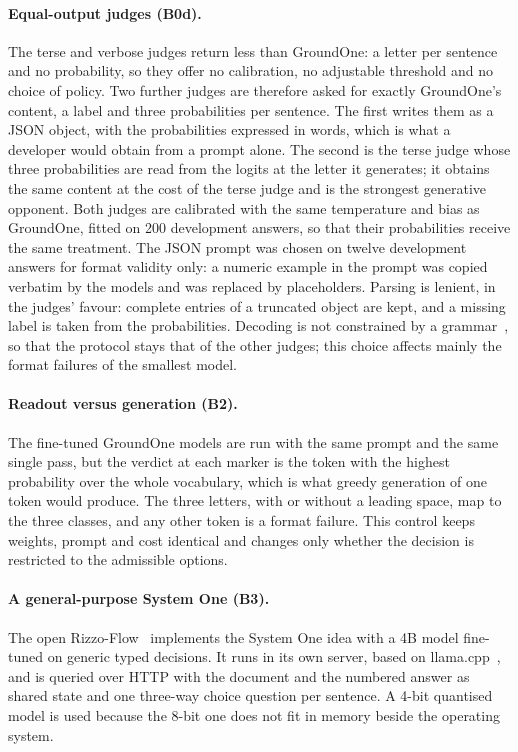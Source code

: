 \paragraph{Equal-output judges (B0d).} The terse and verbose judges return less than GroundOne: a letter per sentence
and no probability, so they offer no calibration, no adjustable threshold and no choice of policy. Two further judges
are therefore asked for exactly GroundOne's content, a label and three probabilities per sentence. The first writes them
as a JSON object, with the probabilities expressed in words, which is what a developer would obtain from a prompt alone.
The second is the terse judge whose three probabilities are read from the logits at the letter it generates; it obtains
the same content at the cost of the terse judge and is the strongest generative opponent. Both judges are calibrated
with the same temperature and bias as GroundOne, fitted on 200 development answers, so that their probabilities receive
the same treatment. The JSON prompt was chosen on twelve development answers for format validity only: a numeric example
in the prompt was copied verbatim by the models and was replaced by placeholders. Parsing is lenient, in the judges'
favour: complete entries of a truncated object are kept, and a missing label is taken from the probabilities. Decoding
is not constrained by a grammar~\cite{willard2023outlines}, so that the protocol stays that of the other judges; this
choice affects mainly the format failures of the smallest model.

\paragraph{Readout versus generation (B2).} The fine-tuned GroundOne models are run with the same prompt and the same
single pass, but the verdict at each marker is the token with the highest probability over the whole vocabulary, which is
what greedy generation of one token would produce. The three letters, with or without a leading space, map to the three
classes, and any other token is a format failure. This control keeps weights, prompt and cost identical and changes only
whether the decision is restricted to the admissible options.

\paragraph{A general-purpose System One (B3).} The open Rizzo-Flow~\cite{rizzoflow} implements the System One
idea with a 4B model fine-tuned on generic typed decisions. It runs in its own server, based on
llama.cpp~\cite{llamacpp}, and is queried over HTTP with the document and the numbered answer as shared state and one
three-way choice question per sentence. A 4-bit quantised model is used because the 8-bit one does not fit in memory
beside the operating system.

